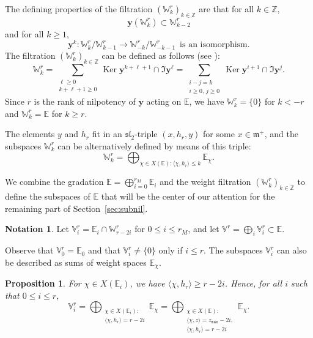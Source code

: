 \documentclass[JEP,XML,SOM,Unicode,NoFloatCountersInSection]{cedram}
\theoremstyle{plain}
\newtheorem{prop}[theo]{Proposition}
\theoremstyle{definition}
\newtheorem{nota}[theo]{Notation}
\let\rgy r
\DeclareMathOperator{\Ker}{Ker}
\newcommand{\bE}{\mathbb{E}}
\newcommand{\bZ}{\mathbb{Z}}
\newcommand{\Vr}{\mathbb{V}^\rgy}
\newcommand{\Wr}{\mathbb{W}^\rgy}
\newcommand{\by}{\boldsymbol{y}}
\newcommand{\fm}{\mathfrak{m}}
\newcommand{\fsl}{\mathfrak{sl}}
\newcommand{\zmax}{z_{\mathtt{max}}}
\newcommand{\rkm}{{r_M}}
\newcommand{\scal}[1]{\langle #1 \rangle}
\begin{document}
The defining properties of the filtration $(\Wr_k)_{k\in\bZ}$ are that for all $k\in\bZ$,
$$
\by(\Wr_k)\subset\Wr_{k-2}
$$
and for all $k\geq 1$,
\begin{equation}
\label{equa:deligne}
\by^k:\Wr_k/\Wr_{k-1}\to\Wr_{-k}/\Wr_{-k-1}\,\mbox{ is an isomorphism.}
\end{equation}
The filtration $(\Wr_k)_{k\in\bZ}$ can be defined as follows (see \eg \cite{SteenbrinkZucker}):
\begin{equation}
\label{equa:filtration-y}
\Wr_k=\sum_{\substack{\ell \geq 0 \\ k+\ell+1 \geq 0}}
\Ker \by^{k+\ell+1} \cap \Im \by^\ell = \sum_{\substack{i-j=k \\
i\geq 0,\, j\geq 0}}
\Ker \by^{i+1} \cap \Im \by^j.
\end{equation}
Since $\rgy$ is the rank of nilpotency of $\by$ acting on $\bE$, we have $\Wr_{k}=\{0\}$ for $k<-\rgy$ and $\Wr_k=\bE$ for $k\geq \rgy$.

The elements $y$ and $h_\rgy$ fit in an $\fsl_2$-triple $(x,h_\rgy,y)$ for some $x\in\fm^+$, and the subspaces $\Wr_k$ can be alternatively defined by means of this triple:
\begin{equation}
\label{equa:filtration-poids}
\Wr_k=\bigoplus_{\chi \in X(\bE) : \scal{\chi,h_\rgy}\leq k}\bE_\chi.
\end{equation}

We combine the gradation $\bE=\bigoplus_{i=0}^\rkm \bE_i$ and the weight filtration $(\Wr_k)_{k\in\bZ}$
to define the subspaces of $\bE$ that will be the center of our attention for the remaining part of
Section~\ref{sec:subnil}.

\begin{nota}\label{defi:V}
Let $\Vr_i=\bE_i\cap\Wr_{r-2i}$ for $0\leq i\leq \rkm$,
and let $\Vr=\bigoplus_i\Vr_i\subset\bE$.
\end{nota}

Observe that $\Vr_0=\bE_0$ and that $\Vr_i\neq\{0\}$ only if $i\leq r$. The subspaces $\Vr_i$ can also be described as sums of weight spaces $\bE_\chi$.

\begin{prop}\label{prop:chi-Ei}
For $\chi\!\in\!X(\bE_i)$, we have $\scal{\chi, h_\rgy}\!\geq\!\rgy - 2i$. Hence, for all $i$ such that $0\leq i\leq r$,
$$
\Vr_i=\bigoplus_{\substack{\chi\in X(\bE_i):\\\scal{\chi,h_\rgy}=r-2i}}\bE_\chi=\bigoplus_{\substack{\chi\in X(\bE):\\ \scal{\chi,z}=\zmax-2i,\\\scal{\chi,h_\rgy}=r-2i}}\bE_\chi.
$$
\end{prop}
\end{document}
